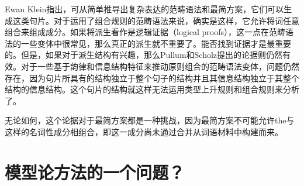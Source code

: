 Ewan Klein指出，可从简单推导出复杂表达的范畴语法\indexcg 和最简方案，它们可以生成这类句片\citep[]{Pullum2013a}。对于运用了组合规则的范畴语法来说，确实是这样，它允许将词任意组合来组成成分。如果将派生看作是逻辑证据（logical proofs），这一点在范畴语法的一些变体中很常见，那么真正的派生就不重要了。能否找到证据才是最重要的。但是，如果对于派生结构有兴趣，那么Pullum和Scholz提出的论据则仍然有效。对于一些基于韵律和信息结构特征来推动原则组合的范畴语法变体\citep[\S~3]{Steedman91a}，问题仍然存在，因为句片所具有的结构独立于整个句子的结构并且其信息结构独立于其整个结构的信息结构。这个句片的结构就这样无法运用类型上升规则和组合规则来分析了。

无论如何，这个论据对于最简方案都是一种挑战，因为最简方案不可能允许the与这样的名词性成分相组合，即这一成分尚未通过合并从词语材料中构建而来。

\section{模型论方法的一个问题？}
\label{Abschnitt-MTS-ten-Hacken}

